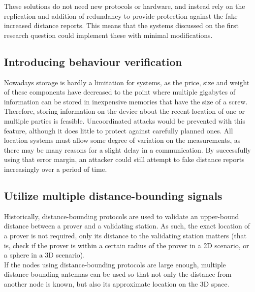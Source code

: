 \documentclass{article}
\begin{document}
These solutions do not need new protocols or hardware, and instead rely on the replication and addition of redundancy to provide protection against the fake increased distance reports. This means that the systems discussed on the first research question could implement these with minimal modifications.\\

\subsection{Introducing behaviour verification}

Nowadays storage is hardly a limitation for systems, as the price, size and weight of these components have decreased to the point where multiple gigabytes of information can be stored in inexpensive memories that have the size of a screw.\\

Therefore, storing information on the device about the recent location of one or multiple parties is feasible. Uncoordinated attacks would be prevented with this feature, although it does little to protect against carefully planned ones. All location systems must allow some degree of variation on the measurements, as there may be many reasons for a slight delay in a communication. By successfully using that error margin, an attacker could still attempt to fake distance reports increasingly over a period of time.\\



\subsection{Utilize multiple distance-bounding signals}

Historically, distance-bounding protocols are used to validate an upper-bound distance between a prover and a validating station. As such, the exact location of a prover is not required, only its distance to the validating station matters (that is, check if the prover is within a certain radius of the prover in a 2D scenario, or a sphere in a 3D scenario).\\

If the nodes using distance-bounding protocols are large enough, multiple distance-bounding antennas can be used so that not only the distance from another node is known, but also its approximate location on the 3D space.\\
\end{document}
